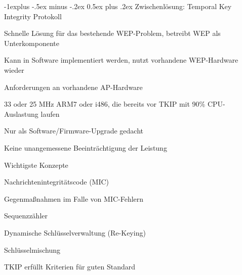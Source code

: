 \documentclass[a4paper]{article}
\makeatletter
\renewcommand{\subsection}{\@startsection{subsection}{2}{0mm}%
 {-1explus -.5ex minus -.2ex}%
 {0.5ex plus .2ex}%
 {\normalfont\normalsize\bfseries}}
\makeatother
\begin{document}
\begin{multicols}{3}
      \subsection{Zwischenlösung: Temporal Key Integrity Protokoll}
      \begin{itemize*}
            \item Schnelle Lösung für das bestehende WEP-Problem, betreibt WEP als Unterkomponente
            \item Kann in Software implementiert werden, nutzt vorhandene WEP-Hardware wieder
            \item Anforderungen an vorhandene AP-Hardware
            \begin{itemize*}
                  \item 33 oder 25 MHz ARM7 oder i486, die bereits vor TKIP mit 90\% CPU-Auslastung laufen
                  \item Nur als Software/Firmware-Upgrade gedacht
                  \item Keine unangemessene Beeinträchtigung der Leistung
            \end{itemize*}
            \item Wichtigste Konzepte
            \begin{itemize*}
                  \item Nachrichtenintegritätscode (MIC)
                  \item Gegenmaßnahmen im Falle von MIC-Fehlern
                  \item Sequenzzähler
                  \item Dynamische Schlüsselverwaltung (Re-Keying)
                  \item Schlüsselmischung
            \end{itemize*}
            \item TKIP erfüllt Kriterien für guten Standard
      \end{itemize*}


\end{multicols}
\end{document}
